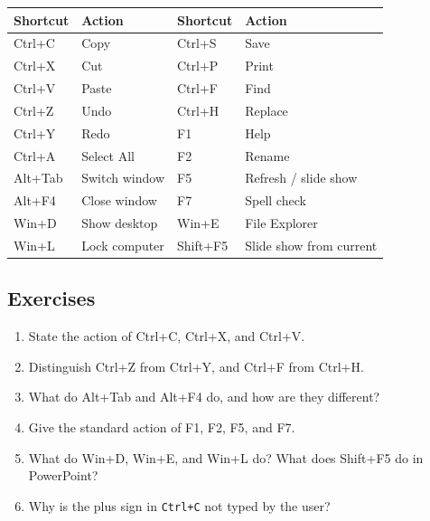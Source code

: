 \begin{center}
\begin{tabular}{p{}p{}p{}p{}}
\toprule
\textbf{Shortcut} & \textbf{Action} & \textbf{Shortcut} & \textbf{Action} \\
\midrule
Ctrl+C & Copy & Ctrl+S & Save \\
Ctrl+X & Cut & Ctrl+P & Print \\
Ctrl+V & Paste & Ctrl+F & Find \\
Ctrl+Z & Undo & Ctrl+H & Replace \\
Ctrl+Y & Redo & F1 & Help \\
Ctrl+A & Select All & F2 & Rename \\
Alt+Tab & Switch window & F5 & Refresh / slide show \\
Alt+F4 & Close window & F7 & Spell check \\
Win+D & Show desktop & Win+E & File Explorer \\
Win+L & Lock computer & Shift+F5 & Slide show from current \\
\bottomrule
\end{tabular}
\end{center}

\subsection*{Exercises}
\begin{enumerate}[label=\arabic*.]
  \item State the action of Ctrl+C, Ctrl+X, and Ctrl+V.
  \item Distinguish Ctrl+Z from Ctrl+Y, and Ctrl+F from Ctrl+H.
  \item What do Alt+Tab and Alt+F4 do, and how are they different?
  \item Give the standard action of F1, F2, F5, and F7.
  \item What do Win+D, Win+E, and Win+L do? What does Shift+F5 do in
    PowerPoint?
  \item Why is the plus sign in \texttt{Ctrl+C} not typed by the user?
\end{enumerate}


